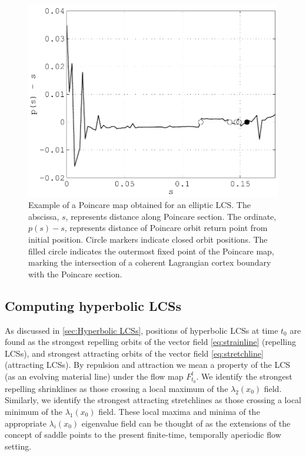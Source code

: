 \documentclass{elsarticle}
\begin{document}
\begin{figure}
\begin{center}
\includegraphics[width=.8\textwidth]{graphics/double_gyre/poincare_return_map}
\end{center}
\caption{Example of a Poincare map obtained for an elliptic LCS. The abscissa, $s$, represents distance along Poincare section. The ordinate, $p(s) - s$, represents distance of Poincare orbit return point from initial position. Circle markers indicate closed orbit positions. The filled circle indicates the outermost fixed point of the Poincare map, marking the intersection of a coherent Lagrangian cortex boundary with the Poincare section.}
\label{f:Poincare return map}
\end{figure}

\subsection{Computing hyperbolic LCSs}

As discussed in \cref{sec:Hyperbolic LCSs}, positions of hyperbolic LCSs at time $t_0$ are found as the strongest repelling orbits of the vector field \cref{eq:strainline} (repelling LCSs), and strongest attracting orbits of the vector field \cref{eq:stretchline} (attracting LCSs). By repulsion and attraction we mean a property of the LCS (as an evolving material line) under the flow map $F_{t_0}^t$. We identify the strongest repelling shrinklines as those crossing a local maximum of the $\lambda_2(x_0)$ field. Similarly, we identify the strongest attracting stretchlines as those crossing a local minimum of the $\lambda_1(x_0)$ field. These local maxima and minima of the appropriate $\lambda_i(x_0)$ eigenvalue field can be thought of as the extensions of the concept of saddle points to the present finite-time, temporally aperiodic flow setting.
\end{document}
